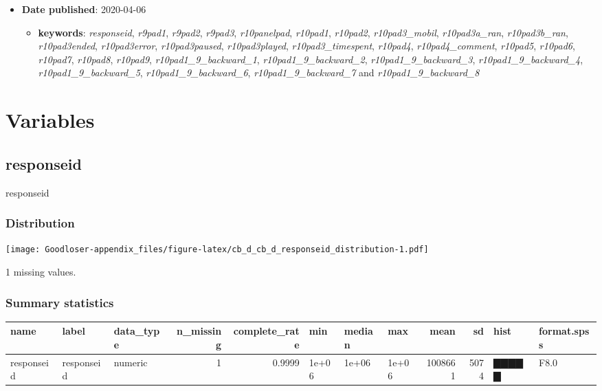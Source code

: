 \documentclass[
]{book}
\providecommand{\tightlist}{%
  \setlength{\itemsep}{0pt}\setlength{\parskip}{0pt}}
\begin{document}
\begin{itemize}
\item
  \textbf{Date published}: 2020-04-06

  \begin{itemize}
  \tightlist
  \item
    \textbf{keywords}: \emph{responseid}, \emph{r9pad1}, \emph{r9pad2}, \emph{r9pad3}, \emph{r10panelpad}, \emph{r10pad1}, \emph{r10pad2}, \emph{r10pad3\_mobil}, \emph{r10pad3a\_ran}, \emph{r10pad3b\_ran}, \emph{r10pad3ended}, \emph{r10pad3error}, \emph{r10pad3paused}, \emph{r10pad3played}, \emph{r10pad3\_timespent}, \emph{r10pad4}, \emph{r10pad4\_comment}, \emph{r10pad5}, \emph{r10pad6}, \emph{r10pad7}, \emph{r10pad8}, \emph{r10pad9}, \emph{r10pad1\_9\_backward\_1}, \emph{r10pad1\_9\_backward\_2}, \emph{r10pad1\_9\_backward\_3}, \emph{r10pad1\_9\_backward\_4}, \emph{r10pad1\_9\_backward\_5}, \emph{r10pad1\_9\_backward\_6}, \emph{r10pad1\_9\_backward\_7} and \emph{r10pad1\_9\_backward\_8}
  \end{itemize}
\end{itemize}

\hypertarget{variables-1}{%
\section{Variables}\label{variables-1}}

\hypertarget{responseid}{%
\subsection{responseid}\label{responseid}}

responseid

\hypertarget{responseid_distribution}{%
\subsubsection{Distribution}\label{responseid_distribution}}

\texttt{[image: Goodloser-appendix\_files/figure-latex/cb\_d\_cb\_d\_responseid\_distribution-1.pdf]}

1 missing values.

\hypertarget{responseid_summary}{%
\subsubsection{Summary statistics}\label{responseid_summary}}

\begin{tabular}{l|l|l|r|r|l|l|l|r|r|l|l}
\hline
name & label & data_type & n_missing & complete_rate & min & median & max & mean & sd & hist & format.spss\\
\hline
responseid & responseid & numeric & 1 & 0.9999 & 1e+06 & 1e+06 & 1e+06 & 1008661 & 5074 & ▇▇▇▇▇ & F8.0\\
\hline
\end{tabular}
\end{document}
